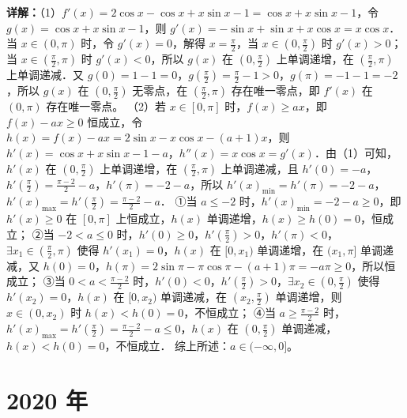 \begin{question}[points=12]
\begin{solution}
\textbf{详解：}（1）$f'(x)=2\cos x - \cos x + x\sin x -1 = \cos x + x\sin x -1$，令 $g(x)=\cos x + x\sin x -1$，则 $g'(x)=-\sin x + \sin x + x\cos x = x\cos x$．当 $x \in (0,\pi)$ 时，令 $g'(x)=0$，解得 $x=\frac{\pi}{2}$，当 $x\in(0,\frac{\pi}{2})$ 时 $g'(x)>0$；当 $x\in(\frac{\pi}{2},\pi)$ 时 $g'(x)<0$，所以 $g(x)$ 在 $(0,\frac{\pi}{2})$ 上单调递增，在 $(\frac{\pi}{2},\pi)$ 上单调递减．又 $g(0)=1-1=0$，$g(\frac{\pi}{2})=\frac{\pi}{2}-1>0$，$g(\pi)=-1-1=-2$，所以 $g(x)$ 在 $(0,\frac{\pi}{2})$ 无零点，在 $(\frac{\pi}{2},\pi)$ 存在唯一零点，即 $f'(x)$ 在 $(0,\pi)$ 存在唯一零点。
（2）若 $x\in[0,\pi]$ 时，$f(x)\ge ax$，即 $f(x)-ax\ge0$ 恒成立，令 $h(x)=f(x)-ax=2\sin x - x\cos x - (a+1)x$，则 $h'(x)=\cos x + x\sin x -1 - a$，$h''(x)=x\cos x = g'(x)$．由（1）可知，$h'(x)$ 在 $(0,\frac{\pi}{2})$ 上单调递增，在 $(\frac{\pi}{2},\pi)$ 上单调递减，且 $h'(0)=-a$，$h'(\frac{\pi}{2})=\frac{\pi-2}{2}-a$，$h'(\pi)=-2-a$，所以 $h'(x)_{\min}=h'(\pi)=-2-a$，$h'(x)_{\max}=h'(\frac{\pi}{2})=\frac{\pi-2}{2}-a$．
①当 $a\le -2$ 时，$h'(x)_{\min}=-2-a\ge0$，即 $h'(x)\ge0$ 在 $[0,\pi]$ 上恒成立，$h(x)$ 单调递增，$h(x)\ge h(0)=0$，恒成立；
②当 $-2<a\le0$ 时，$h'(0)\ge0$，$h'(\frac{\pi}{2})>0$，$h'(\pi)<0$，$\exists x_1\in(\frac{\pi}{2},\pi)$ 使得 $h'(x_1)=0$，$h(x)$ 在 $[0,x_1)$ 单调递增，在 $(x_1,\pi]$ 单调递减，又 $h(0)=0$，$h(\pi)=2\sin \pi - \pi\cos \pi - (a+1)\pi = -a\pi \ge 0$，所以恒成立；
③当 $0<a<\frac{\pi-2}{2}$ 时，$h'(0)<0$，$h'(\frac{\pi}{2})>0$，$\exists x_2\in(0,\frac{\pi}{2})$ 使得 $h'(x_2)=0$，$h(x)$ 在 $[0,x_2)$ 单调递减，在 $(x_2,\frac{\pi}{2})$ 单调递增，则 $x\in(0,x_2)$ 时 $h(x)<h(0)=0$，不恒成立；
④当 $a\ge \frac{\pi-2}{2}$ 时，$h'(x)_{\max}=h'(\frac{\pi}{2})=\frac{\pi-2}{2}-a\le0$，$h(x)$ 在 $(0,\frac{\pi}{2})$ 单调递减，$h(x)<h(0)=0$，不恒成立．
综上所述：$a\in(-\infty,0]$。
\end{solution}
\end{question}

\section*{2020 年}

